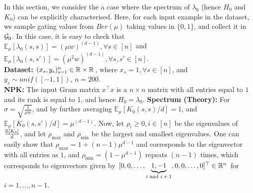 In this section, we consider the a case where the spectrum of $\lambda_0$ (hence $H_0$ and $K_0$) can be explicitly characterised. Here, for each input example in the dataset, we sample gating values from $Ber(\mu)$ taking values in $\{0,1\}$, and collect it in $\mathcal{G}_0$. In this case, it is easy to check that $\mathbb{E}_{\mu}\left[\lambda_0(s,s)\right]=(\mu w)^{(d-1)},\forall s\in[n]$ and $\mathbb{E}_{\mu}\left[\lambda_0(s,s')\right]=(\mu^2 w)^{(d-1)},\forall s,s'\in[n]$.\\
\textbf{Dataset:} $(x_s,y_s)_{s=1}^n\in \mathbb{R}\times \mathbb{R}$, where $x_s=1,\forall s\in [n]$, and $y_s\sim unif([-1,1])$, $n=200$. \\
\textbf{NPK:} The input Gram matrix $x^\top x$ is a $n\times n$ matrix with all entries equal to $1$ and its rank is equal to 1, and hence $H_0=\lambda_0$.\WFclear
\textbf{Spectrum (Theory):} For $\sigma=\sqrt{\frac{1}{\mu w}}$, and by further averaging $\mathbb{E}_{\mu}\left[K_0(s,s)/d\right]=1$, and $\mathbb{E}_{\mu}\left[K_0(s,s')/d\right]=\mu^{(d-1)}$. Now, let $\rho_i\geq 0,i \in [n]$ be the eigenvalues of $\frac{\mathbb{E}\left[K_0\right]}{d}$, and let $\rho_{\max}$ and $\rho_{\min}$ be the largest and smallest eigenvalues. One can easily show that $\rho_{\max}=1+(n-1)\mu^{d-1}$ and corresponds to the eigenvector with all entries as $1$, and $\rho_{\min}=(1-\mu^{d-1})$ repeats $(n-1)$ times, which corresponds to eigenvectors given by $[0, 0, \ldots, \underbrace{1, -1}_{\text{$i$ and $i+1$}}, 0,0,\ldots, 0]^\top \in \mathbb{R}^n$ for $i=1,\ldots,n-1$.\\

